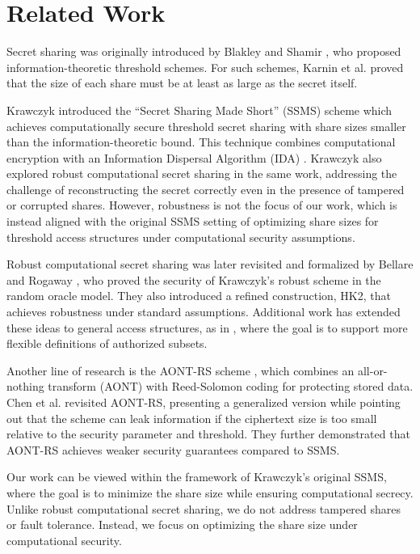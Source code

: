\section{Related Work}
Secret sharing was originally introduced by Blakley \cite{blakely} and Shamir \cite{shamir}, who proposed information-theoretic threshold schemes. For such schemes, Karnin et al. \cite{hellman2} proved that the size of each share must be at least as large as the secret itself. 

Krawczyk \cite{krawczyk1993secret} introduced the “Secret Sharing Made Short” (SSMS) scheme which achieves computationally secure threshold secret sharing with share sizes smaller than the information-theoretic bound. This technique combines computational encryption with an Information Dispersal Algorithm (IDA) \cite{rabin1990information,naor1995optimal,beguin1998general,1023682}. Krawczyk also explored robust computational secret sharing in the same work, addressing the challenge of reconstructing the secret correctly even in the presence of tampered or corrupted shares. However, robustness is not the focus of our work, which is instead aligned with the original SSMS setting of optimizing share sizes for threshold access structures under computational security assumptions.

Robust computational secret sharing was later revisited and formalized by Bellare and Rogaway \cite{bellare2007robust}, who proved the security of Krawczyk’s robust scheme in the random oracle model. They also introduced a refined construction, HK2, that achieves robustness under standard assumptions. Additional work has extended these ideas to general access structures, as in \cite{beguin1995general,cachin1995line,mayer1997generalized,vinod2003power}, where the goal is to support more flexible definitions of authorized subsets.

Another line of research is the AONT-RS scheme \cite{resch2011aont}, which combines an all-or-nothing transform (AONT) \cite{rivest1997all} with Reed-Solomon coding \cite{reed1960polynomial} for protecting stored data. Chen et al. \cite{chen2017revisiting} revisited AONT-RS, presenting a generalized version while pointing out that the scheme can leak information if the ciphertext size is too small relative to the security parameter and threshold. They further demonstrated that AONT-RS achieves weaker security guarantees compared to SSMS. 

Our work can be viewed within the framework of Krawczyk’s original SSMS, where the goal is to minimize the share size while ensuring computational secrecy. Unlike robust computational secret sharing, we do not address tampered shares or fault tolerance. Instead, we focus on optimizing the share size under computational security.